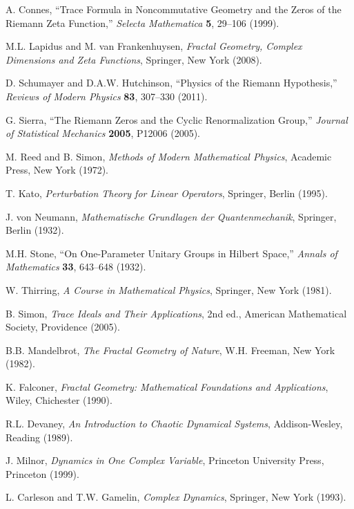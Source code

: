 \documentclass[11pt]{article}
\theoremstyle{plain}
\theoremstyle{definition}
\theoremstyle{remark}
\begin{document}
\begin{thebibliography}{99}
 A. Connes, ``Trace Formula in Noncommutative Geometry and the Zeros of the Riemann Zeta Function,'' \emph{Selecta Mathematica} \textbf{5}, 29--106 (1999).

 M.L. Lapidus and M. van Frankenhuysen, \emph{Fractal Geometry, Complex Dimensions and Zeta Functions}, Springer, New York (2008).

 D. Schumayer and D.A.W. Hutchinson, ``Physics of the Riemann Hypothesis,'' \emph{Reviews of Modern Physics} \textbf{83}, 307--330 (2011).

 G. Sierra, ``The Riemann Zeros and the Cyclic Renormalization Group,'' \emph{Journal of Statistical Mechanics} \textbf{2005}, P12006 (2005).

 M. Reed and B. Simon, \emph{Methods of Modern Mathematical Physics}, Academic Press, New York (1972).

 T. Kato, \emph{Perturbation Theory for Linear Operators}, Springer, Berlin (1995).

 J. von Neumann, \emph{Mathematische Grundlagen der Quantenmechanik}, Springer, Berlin (1932).

 M.H. Stone, ``On One-Parameter Unitary Groups in Hilbert Space,'' \emph{Annals of Mathematics} \textbf{33}, 643--648 (1932).

 W. Thirring, \emph{A Course in Mathematical Physics}, Springer, New York (1981).

 B. Simon, \emph{Trace Ideals and Their Applications}, 2nd ed., American Mathematical Society, Providence (2005).

 B.B. Mandelbrot, \emph{The Fractal Geometry of Nature}, W.H. Freeman, New York (1982).

 K. Falconer, \emph{Fractal Geometry: Mathematical Foundations and Applications}, Wiley, Chichester (1990).

 R.L. Devaney, \emph{An Introduction to Chaotic Dynamical Systems}, Addison-Wesley, Reading (1989).

 J. Milnor, \emph{Dynamics in One Complex Variable}, Princeton University Press, Princeton (1999).

 L. Carleson and T.W. Gamelin, \emph{Complex Dynamics}, Springer, New York (1993).


\end{thebibliography}
\end{document}
